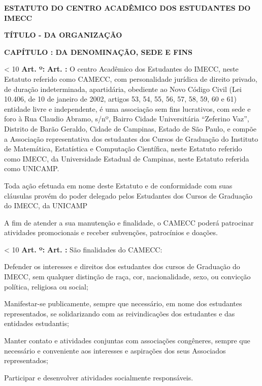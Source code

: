 \documentclass[capitulo]{br-lex}
\newcommand{\documentTitle}[1]{
    \begin{center}
        \MakeUppercase{\textbf{#1}}
    \end{center}
}
\newcounter{tit}
\newcounter{chap}
\newcounter{sec}
\newcounter{art}
\renewcommand{\titulo}[1]{
    \vspace{20pt}
    \begin{center}
        \textbf{\uppercase{Título} \Roman{tit} - \uppercase{#1}}
    \end{center}
    \stepcounter{tit}
}
\newcommand{\capitulo}[1]{
    \vspace{20pt}
    \textbf{\uppercase{Capítulo} \Roman{chap}: \uppercase{#1}}
    \stepcounter{chap}
    \setcounter{sec}{1}
}
\renewcommand{\artigo}{
    \ifnum\value{art} < 10
        \textbf{Art. \arabic{art}º:}
    \else
        \textbf{Art. \arabic{art}:}
    \fi
    \stepcounter{art}
    \setcounter{inciso}{0}
    \setcounter{paragrafo}{0}
}
\begin{document}
\pagestyle{fancy}

\documentTitle{Estatuto do Centro Acadêmico dos Estudantes do IMECC}

\titulo{da organização}

\capitulo{da denominação, sede e fins}

\artigo O centro Acadêmico dos Estudantes do IMECC, neste Estatuto referido como CAMECC, com personalidade jurídica de direito privado, de duração indeterminada, apartidária, obediente ao Novo Código Civil (Lei 10.406, de 10 de janeiro de 2002, artigos 53, 54, 55, 56, 57, 58, 59, 60 e 61) entidade livre e independente, é uma associação sem fins lucrativos, com sede e foro à Rua Claudio Abramo, s/nº, Bairro Cidade Universitária “Zeferino Vaz”, Distrito de Barão Geraldo, Cidade de Campinas, Estado de São Paulo, e compõe a Associação representativa dos estudantes dos Cursos de Graduação do Instituto de Matemática, Estatística e Computação Científica, neste Estatuto referido como IMECC, da Universidade Estadual de Campinas, neste Estatuto referida como UNICAMP.

\paragrafo Toda ação efetuada em nome deste Estatuto e de conformidade com suas cláusulas provém do poder delegado pelos Estudantes dos Cursos de Graduação do IMECC, da UNICAMP

\paragrafo A fim de atender a sua manutenção e finalidade, o CAMECC poderá patrocinar atividades promocionais e receber subvenções, patrocínios e doações.

\artigo São finalidades do CAMECC:

\inciso Defender os interesses e direitos dos estudantes dos cursos de Graduação do IMECC, sem qualquer distinção de raça, cor, nacionalidade, sexo, ou convicção política, religiosa ou social;

\inciso Manifestar-se publicamente, sempre que necessário, em nome dos estudantes representados, se solidarizando com as reivindicações dos estudantes e das entidades estudantis;

\inciso Manter contato e atividades conjuntas com associações congêneres, sempre que necessário e conveniente aos interesses e aspirações dos seus Associados representados;

\inciso Participar e desenvolver atividades socialmente responsáveis.
\end{document}
